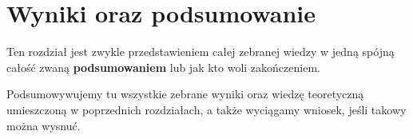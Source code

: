 \chapter{Wyniki oraz podsumowanie}
\label{chap:wyniki-oraz-podsumowanie}

Ten rozdział jest zwykle przedstawieniem całej zebranej wiedzy w jedną spójną całość zwaną \textbf{podsumowaniem} lub jak kto woli zakończeniem.

Podsumowywujemy tu wszystkie zebrane wyniki oraz wiedzę teoretyczną umieszczoną w poprzednich rozdziałach, a także wyciągamy wniosek, jeśli takowy można wysnuć.